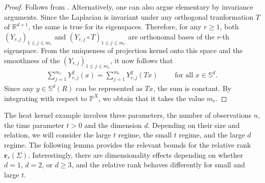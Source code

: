 \documentclass[a4paper,11pt]{article} %
\numberwithin{equation}{section}
\theoremstyle{definition}
\theoremstyle{remark}
\theoremstyle{plain}
\begin{document}
\begin{proof}[Proof]%
  Follows from \cite[Theorem 2.9]{MR2934227}. Alternatively, one can also argue elementary by invariance arguments. Since the Laplacian is invariant under any orthogonal tranformation \( T \) of \( \mathbb{R}^{d + 1} \), the same is true for its eigenspaces.
  Therefore, for any \( r \ge 1 \), both \( (Y_{r,j})_{1\leq j\leq m_r} \) and \( (Y_{r,j} \circ T)_{1\leq j\leq m_r} \) are orthonomal bases of the \( r \)-th eigenspace.
  From the uniqueness of projection kernel onto this space and the smoothness of the \( (Y_{r,j})_{1\leq j\leq m_r} \), it now follows that
  \begin{align}
    \sum_{j=1}^{m_r}  Y_{r,j}^{2}(x) = \sum_{j=1}^{m_r} Y_{r,j}^{2}(T x)
    \qquad \text{ for all } x \in \mathbb{S}^{d}.
  \end{align}
  Since any \( y \in \mathbb{S}^{d}(R) \) can be represented as \( T x \), the sum is constant.
  By integrating with respect to \( \mathbb{P}^{X} \), we obtain that it takes the value \( m_{r} \). 
\end{proof}%

The heat kernel example involves three parameters, the number of observations $n$, the time parameter $t>0$ and the dimension $d$. Depending on their size and relation, we will consider the large $t$ regime, the small $t$ regime, and the large $d$ regime. The following lemma provides the relevant bounds for the relative rank \( \mathbf{r}_{r}(\Sigma) \). Interestingly, there are dimensionality effects depending on whether $d=1$, $d=2$, or $d\geq 3$, and the relative rank behaves differently for small and large $t$.
\end{document}

